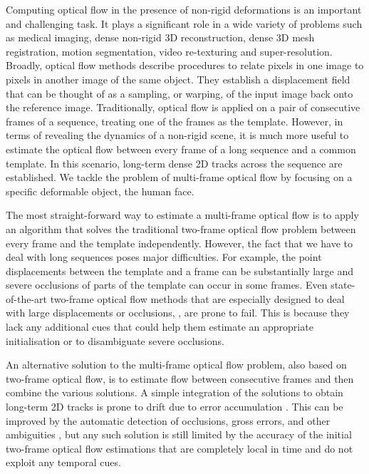 Computing optical flow in the presence of non-rigid deformations
is an important and challenging task. It plays a significant role in a wide variety of 
problems such as medical imaging, dense non-rigid 3D reconstruction, 
dense 3D mesh registration, motion segmentation, video re-texturing and super-resolution.
Broadly, optical flow methods describe procedures to relate pixels in
one image to pixels in another image of the same object. They establish a 
displacement field that can be thought of as a sampling, or warping, of the input 
image back onto the reference image. Traditionally, optical flow is applied on a pair 
of consecutive frames of a sequence, treating one of the frames as the template.
However, in terms of revealing the dynamics of a non-rigid scene, it is much more 
useful to estimate the optical flow between every frame of a long sequence and a 
common template. In this scenario, long-term dense 2D tracks across the sequence are established. 
We tackle the problem of multi-frame optical flow by focusing on a 
specific deformable object, the human face.

The most straight-forward way to estimate a multi-frame optical flow is to apply an 
algorithm that solves the traditional two-frame optical flow problem between every 
frame and the template independently.
However, the fact that we have to deal with long sequences poses major difficulties. 
For example, the point displacements between the template and a frame can be substantially 
large and severe occlusions of parts of the template can occur in some frames. Even 
state-of-the-art two-frame optical flow methods that are especially designed to deal 
with large displacements or occlusions, \eg \cite{Brox:2011be,revaud2015epicflow}, are 
prone to fail. This is because they lack any additional cues that could help them 
estimate an appropriate initialisation or to disambiguate severe occlusions.

An alternative solution to the multi-frame optical flow problem, also based on 
two-frame optical flow, is to estimate flow between consecutive frames and then 
combine the various solutions. A simple integration of the solutions to obtain long-term 
2D tracks is prone to drift due to error accumulation \cite{RefWorks:292,Brox:2011be}.
This can be improved by the automatic detection of occlusions, gross errors, and other ambiguities 
\cite{sand2008particle,sundaram2010dense,rubinstein2012towards,ricco2012simultaneous,GSRPCA}, 
but any such solution is still limited by the accuracy of the initial two-frame optical 
flow estimations that are completely local in time and do not exploit any temporal cues.

